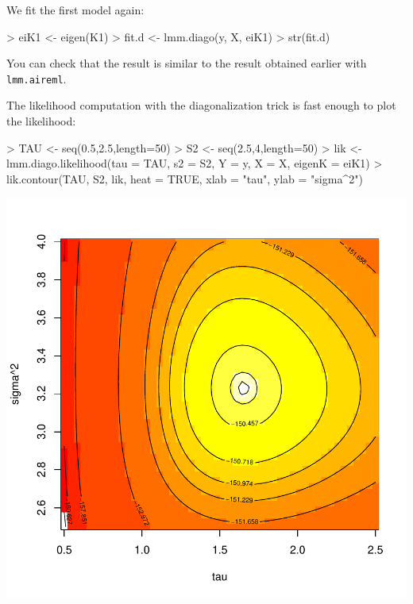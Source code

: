 \documentclass{article}
\renewenvironment{Schunk}{\vspace{\topsep}}{\vspace{\topsep}}
\begin{document}
  We fit the first model again:
 
\begin{Schunk}
\begin{Sinput}
> eiK1 <- eigen(K1)
> fit.d <- lmm.diago(y, X, eiK1)
> str(fit.d)
\end{Sinput}
\end{Schunk}
  You can check that the result is similar to the result obtained earlier with 
  \verb!lmm.aireml!.

  The likelihood computation with the diagonalization trick is fast enough to 
  plot the likelihood:

\begin{center}
\begin{Schunk}
\begin{Sinput}
> TAU <- seq(0.5,2.5,length=50)
> S2 <- seq(2.5,4,length=50)
> lik <- lmm.diago.likelihood(tau = TAU, s2 = S2, Y = y, X = X, eigenK = eiK1)
> lik.contour(TAU, S2, lik, heat = TRUE, xlab = "tau", ylab = "sigma^2")
\end{Sinput}
\end{Schunk}
\includegraphics{gaston-047}
\end{center}
\end{document}
